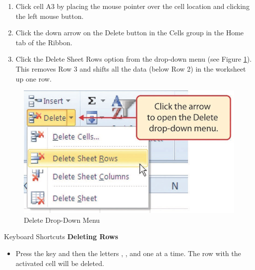 \begin{enumerate}
	\item Click cell \textsf{A3} by placing the mouse pointer over the cell location and clicking the left mouse button.
	\item Click the down arrow on the Delete button in the Cells group in the Home tab of the Ribbon.
	\item Click the Delete Sheet Rows option from the drop-down menu (see Figure \ref{01:fig31}). This removes Row 3 and shifts all the data (below Row 2) in the worksheet up one row.
\end{enumerate}

\begin{figure}[H]
	\centering
	\includegraphics[width=\maxwidth{.95\linewidth}]{gfx/ch01_fig31}
	\caption{Delete Drop-Down Menu}
	\label{01:fig31}
\end{figure}

\begin{center}
	\begin{shtcutbox}{Keyboard Shortcuts}
		\textbf{Deleting Rows}
		\\
		\begin{itemize}
			\setlength{\itemsep}{0pt}
			\setlength{\parskip}{0pt}
			\setlength{\parsep}{0pt}
			
			\item Press the  key and then the letters , , and  one at a time. The row with the activated cell will be deleted.
			
		\end{itemize}
	\end{shtcutbox}
\end{center}

